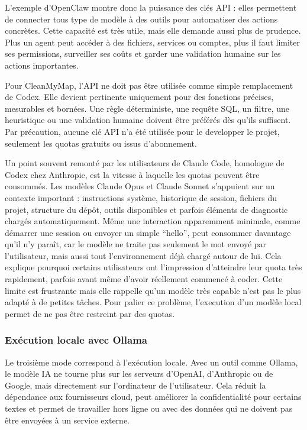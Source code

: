 \documentclass[
  10pt,
  a4paper,
  DIV=11,
  numbers=noendperiod,
  oneside]{scrreprt}
\begin{document}
L'exemple d'OpenClaw montre donc la puissance des clés API : elles
permettent de connecter tous type de modèle à des outils pour
automatiser des actions concrètes. Cette capacité est très utile, mais
elle demande aussi plus de prudence. Plus un agent peut accéder à des
fichiers, services ou comptes, plus il faut limiter ses permissions,
surveiller ses coûts et garder une validation humaine sur les actions
importantes.

Pour CleanMyMap, l'API ne doit pas être utilisée comme simple
remplacement de Codex. Elle devient pertinente uniquement pour des
fonctions précises, mesurables et bornées. Une règle déterministe, une
requête SQL, un filtre, une heuristique ou une validation humaine
doivent être préférés dès qu'ils suffisent. Par précaution, aucune clé
API n'a été utilisée pour le developper le projet, seulement les quotas
gratuits ou issus d'abonnement.

Un point souvent remonté par les utilisateurs de Claude Code, homologue
de Codex chez Anthropic, est la vitesse à laquelle les quotas peuvent
être consommés. Les modèles Claude Opus et Claude Sonnet s'appuient sur
un contexte important : instructions système, historique de session,
fichiers du projet, structure du dépôt, outils disponibles et parfois
éléments de diagnostic chargés automatiquement. Même une interaction
apparemment minimale, comme démarrer une session ou envoyer un simple
``hello'', peut consommer davantage qu'il n'y paraît, car le modèle ne
traite pas seulement le mot envoyé par l'utilisateur, mais aussi tout
l'environnement déjà chargé autour de lui. Cela explique pourquoi
certains utilisateurs ont l'impression d'atteindre leur quota très
rapidement, parfois avant même d'avoir réellement commencé à coder.
Cette limite est frustrante mais elle rappelle qu'un modèle très capable
n'est pas le plus adapté à de petites tâches. Pour palier ce problème,
l'execution d'un modèle local permet de ne pas être restreint par des
quotas.

\subsubsection{Exécution locale avec
Ollama}\label{exuxe9cution-locale-avec-ollama}

Le troisième mode correspond à l'exécution locale. Avec un outil comme
Ollama, le modèle IA ne tourne plus sur les serveurs d'OpenAI,
d'Anthropic ou de Google, mais directement sur l'ordinateur de
l'utilisateur. Cela réduit la dépendance aux fournisseurs cloud, peut
améliorer la confidentialité pour certains textes et permet de
travailler hors ligne ou avec des données qui ne doivent pas être
envoyées à un service externe.
\end{document}
